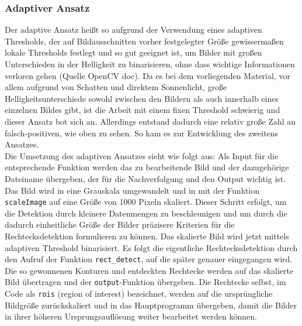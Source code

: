 \subsubsection*{Adaptiver Ansatz}
Der adaptive Ansatz heißt so aufgrund der Verwendung eines adaptiven Thresholds, der auf Bildausschnitten vorher festgelegter Größe gewissermaßen lokale Thresholds festlegt und so gut geeignet ist, um Bilder mit großen Unterschieden in der Helligkeit zu binarisieren, ohne dass wichtige Informationen verloren gehen (Quelle OpenCV doc). Da es bei dem vorliegenden Material, vor allem aufgrund von Schatten und direktem Sonnenlicht, große Helligkeitsunterschiede sowohl zwischen den Bildern als auch innerhalb eines einzelnen Bildes gibt, ist die Arbeit mit einem fixen Threshold schwierig und dieser Ansatz bot sich an. Allerdings entstand dadurch eine relativ große Zahl an falsch-positiven, wie oben zu sehen. So kam es zur Entwicklung des zweitens Ansatzes.\\
Die Umsetzung des adaptiven Ansatzes sieht wie folgt aus:
Als Input für die entsprechende Funktion werden das zu bearbeitende Bild und der dazugehörige Dateiname übergeben, der für die Nachverfolgung und den Output wichtig ist. Das Bild wird in eine Grauskala umgewandelt und in mit der Funktion \verb|scaleImage| auf eine Größe von 1000 Pixeln skaliert. Dieser Schritt erfolgt, um die Detektion durch kleinere Datenmengen zu beschleunigen und um durch die dadurch einheitliche Größe der Bilder präzisere Kriterien für die Rechtecksdetektion formulieren zu können. Das skalierte Bild wird jetzt mittels adaptiven Threshold binarisiert. Es folgt die eigentliche Rechtecksdetektion durch den Aufruf der Funktion \verb|rect_detect|, auf die später genauer eingegangen wird. Die so gewonnenen Konturen und entdeckten Rechtecke werden auf das skalierte Bild übertragen und der \verb|output|-Funktion übergeben. Die Rechtecke selbst, im Code als \verb|rois| (region of interest) bezeichnet, werden auf die ursprüngliche Bildgröße zurückskaliert und in das Hauptprogramm übergeben, damit die Bilder in ihrer höheren Ursprungsauflösung weiter bearbeitet werden können.

